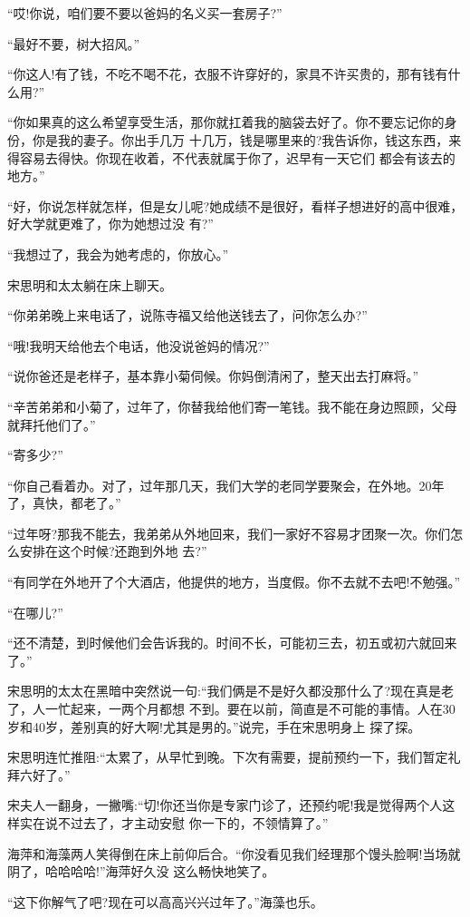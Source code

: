 \documentclass[11pt,a4paper,onecolumn]{article}
\begin{document}
``哎!你说，咱们要不要以爸妈的名义买一套房子?''

``最好不要，树大招风。''

``你这人!有了钱，不吃不喝不花，衣服不许穿好的，家具不许买贵的，那有钱有什么用?''

``你如果真的这么希望享受生活，那你就扛着我的脑袋去好了。你不要忘记你的身份，你是我的妻子。你出手几万
十几万，钱是哪里来的?我告诉你，钱这东西，来得容易去得快。你现在收着，不代表就属于你了，迟早有一天它们
都会有该去的地方。''

``好，你说怎样就怎样，但是女儿呢?她成绩不是很好，看样子想进好的高中很难，好大学就更难了，你为她想过没
有?''

``我想过了，我会为她考虑的，你放心。''

宋思明和太太躺在床上聊天。

``你弟弟晚上来电话了，说陈寺福又给他送钱去了，问你怎么办?''

``哦!我明天给他去个电话，他没说爸妈的情况?''

``说你爸还是老样子，基本靠小菊伺候。你妈倒清闲了，整天出去打麻将。''

``辛苦弟弟和小菊了，过年了，你替我给他们寄一笔钱。我不能在身边照顾，父母就拜托他们了。''

``寄多少?''

``你自己看着办。对了，过年那几天，我们大学的老同学要聚会，在外地。20年了，真快，都老了。''

``过年呀?那我不能去，我弟弟从外地回来，我们一家好不容易才团聚一次。你们怎么安排在这个时候?还跑到外地
去?''

``有同学在外地开了个大酒店，他提供的地方，当度假。你不去就不去吧!不勉强。''

``在哪儿?''

``还不清楚，到时候他们会告诉我的。时间不长，可能初三去，初五或初六就回来了。''

宋思明的太太在黑暗中突然说一句:``我们俩是不是好久都没那什么了?现在真是老了，人一忙起来，一两个月都想
不到。要在以前，简直是不可能的事情。人在30岁和40岁，差别真的好大啊!尤其是男的。''说完，手在宋思明身上
探了探。

宋思明连忙推阻:``太累了，从早忙到晚。下次有需要，提前预约一下，我们暂定礼拜六好了。''

宋夫人一翻身，一撇嘴:``切!你还当你是专家门诊了，还预约呢!我是觉得两个人这样实在说不过去了，才主动安慰
你一下的，不领情算了。''

海萍和海藻两人笑得倒在床上前仰后合。``你没看见我们经理那个馒头脸啊!当场就阴了，哈哈哈哈!''海萍好久没
这么畅快地笑了。

``这下你解气了吧?现在可以高高兴兴过年了。''海藻也乐。
\end{document}
